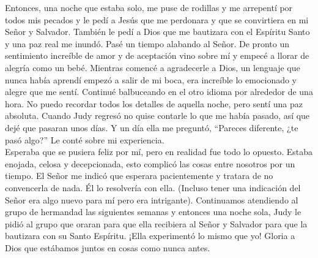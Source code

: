 \documentclass[twoside, 12pt]{book}
\begin{document}
Entonces, una noche que estaba solo, me puse de rodillas y me arrepentí por todos mis pecados y le pedí a Jesús que me perdonara y que se convirtiera en mi Señor y Salvador. También le pedí a Dios que me bautizara con el Espíritu Santo y una paz real me inundó. Pasé un tiempo alabando al Señor. De pronto un sentimiento increíble de amor y de aceptación vino sobre mí y empecé a llorar de alegría como un bebé. Mientras comencé a agradecerle a Dios, un lenguaje que nunca había aprendí empezó a salir de mi boca, era increíble lo emocionado y alegre que me sentí. Continué balbuceando en el otro idioma por alrededor de una hora. No puedo recordar todos los detalles de aquella noche, pero sentí una paz absoluta. Cuando Judy regresó no quise contarle lo que me había pasado, así que dejé que pasaran unos días. Y un día ella me preguntó, “Pareces diferente, ¿te pasó algo?” Le conté sobre mi experiencia.\\

Esperaba que se pusiera feliz por mí, pero en realidad fue todo lo opuesto. Estaba enojada, celosa y decepcionada, esto complicó las cosas entre nosotros por un tiempo.  El Señor me indicó que esperara pacientemente y tratara de no convencerla de nada. Él lo resolvería con ella. (Incluso tener una indicación del Señor era algo nuevo para mí pero era intrigante). Continuamos atendiendo al grupo de hermandad las siguientes semanas y entonces una noche sola, Judy le pidió al grupo que oraran para que ella recibiera al Señor y Salvador para que la bautizara con su Santo Espíritu. ¡Ella experimentó lo mismo que yo! Gloria a Dios que estábamos juntos en cosas como nunca antes.\\
\end{document}
